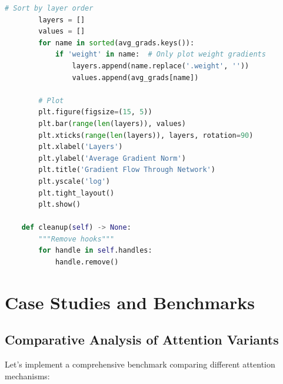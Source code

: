 \documentclass[11pt]{article}
\begin{document}
\begin{lstlisting}[language=Python, caption=Attention Visualization Tools]
        # Sort by layer order
        layers = []
        values = []
        for name in sorted(avg_grads.keys()):
            if 'weight' in name:  # Only plot weight gradients
                layers.append(name.replace('.weight', ''))
                values.append(avg_grads[name])
        
        # Plot
        plt.figure(figsize=(15, 5))
        plt.bar(range(len(layers)), values)
        plt.xticks(range(len(layers)), layers, rotation=90)
        plt.xlabel('Layers')
        plt.ylabel('Average Gradient Norm')
        plt.title('Gradient Flow Through Network')
        plt.yscale('log')
        plt.tight_layout()
        plt.show()
    
    def cleanup(self) -> None:
        """Remove hooks"""
        for handle in self.handles:
            handle.remove()
\end{lstlisting}

\section{Case Studies and Benchmarks}

\subsection{Comparative Analysis of Attention Variants}

Let's implement a comprehensive benchmark comparing different attention mechanisms:
\end{document}
